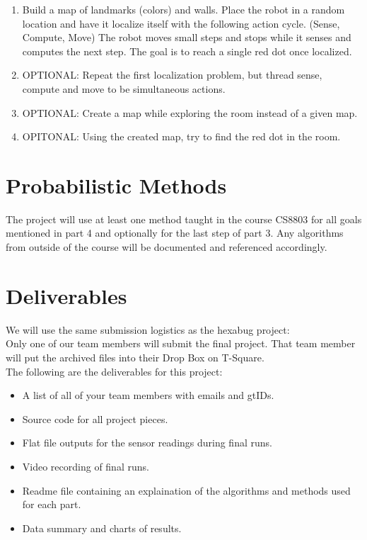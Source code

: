 \documentclass[DIV=calc, paper=a4, fontsize=11pt, onecolumn]{scrartcl}	 %
\begin{document}
\begin{enumerate}
\begin{enumerate}
    \item Build a map of landmarks (colors) and walls. Place the robot in a random location and have it localize itself with the following action cycle. (Sense, Compute, Move) The robot moves small steps and stops while it senses and computes the next step. The goal is to reach a single red dot once localized.
    \item OPTIONAL: Repeat the first localization problem, but thread sense, compute and move to be simultaneous actions.
    \item OPTIONAL: Create a map while exploring the room instead of a given map.
    \item OPITONAL: Using the created map, try to find the red dot in the room.
  \end{enumerate}
\end{enumerate}

\section*{Probabilistic Methods}
The project will use at least one method taught in the course CS8803 for all goals mentioned in part 4 and optionally for the last step of part 3. Any algorithms from outside of the course will be documented and referenced accordingly.

\section*{Deliverables}
We will use the same submission logistics as the hexabug project: \\
Only one of our team members will submit the final project. That team member
will put the archived files into their Drop Box on T-Square. \\
The following are the deliverables for this project:
\begin{itemize}
  \item A list of all of your team members with emails and gtIDs.
  \item Source code for all project pieces.
  \item Flat file outputs for the sensor readings during final runs.
  \item Video recording of final runs.
  \item Readme file containing an explaination of the algorithms and methods used for each part.
  \item Data summary and charts of results.
\end{itemize}

\end{document}
